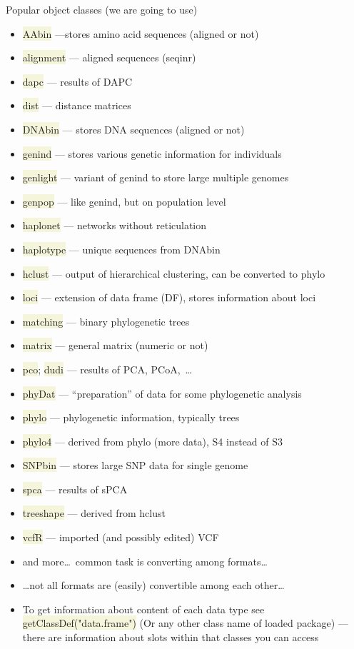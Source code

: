 \documentclass[compress, ucs, xelatex, 11pt, xcolor=svgnames, aspectratio=169,
	hyperref={
		bookmarks=true,
		unicode=true,
		colorlinks=true,
		pdftitle={Molecular data in R},
		plainpages=false,
		pdfauthor={Vojtech Zeisek},
		pdfsubject={Course about phylogeny and evolution in R},
		pdfcreator={XeLaTeX},
		pdfkeywords={R, evolution, phylogeny, molecular data},
		linkcolor=Crimson, %
		anchorcolor=Magenta, %
		citecolor=Magenta, %
		filecolor=Magenta, %
		menucolor=Magenta, %
		urlcolor=DodgerBlue, %
		pdftex},
	url={hyphens, lowtilde} %
	]{beamer}
\renewcommand{\texttt}[1]{\colorbox{Beige}{{\ttfamily #1}}}
\begin{document}
\begin{frame}[allowframebreaks]{Popular object classes (we are going to use)}
	\begin{itemize}
		\item \texttt{AAbin} ---stores amino acid sequences (aligned or not)
		\item \texttt{alignment} --- aligned sequences (seqinr)
		\item \texttt{dapc} --- results of DAPC
		\item \texttt{dist} --- distance matrices
		\item \texttt{DNAbin} --- stores DNA sequences (aligned or not)
		\item \texttt{genind} --- stores various genetic information for individuals
		\item \texttt{genlight} --- variant of genind to store large multiple genomes
		\item \texttt{genpop} --- like genind, but on population level
		\item \texttt{haplonet} --- networks without reticulation
		\item \texttt{haplotype} --- unique sequences from DNAbin
		\item \texttt{hclust} --- output of hierarchical clustering, can be converted to phylo
		\item \texttt{loci} --- extension of data frame (DF), stores information about loci
		\item \texttt{matching} --- binary phylogenetic trees
		\item \texttt{matrix} --- general matrix (numeric or not)
		\item \texttt{pco}; \texttt{dudi} --- results of PCA, PCoA,~\ldots
		\item \texttt{phyDat} --- \enquote{preparation} of data for some phylogenetic analysis
		\item \texttt{phylo} --- phylogenetic information, typically trees
		\item \texttt{phylo4} --- derived from phylo (more data), S4 instead of S3
		\item \texttt{SNPbin} --- stores large SNP data for single genome
		\item \texttt{spca} --- results of sPCA
		\item \texttt{treeshape} --- derived from hclust
		\item \texttt{vcfR} --- imported (and possibly edited) VCF
		\item and more\ldots~common task is converting among formats\ldots
		\item \ldots not all formats are (easily) convertible among each other\ldots
		\item To get information about content of each data type see \texttt{getClassDef("data.frame")} (Or any other class name of loaded package) --- there are information about slots within that classes you can access
	\end{itemize}
\end{frame}
\end{document}

